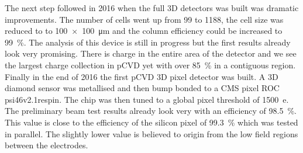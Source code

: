 The next step followed in 2016 when the full 3D detectors was built was dramatic improvements. The number of cells went up from 99 to 1188, the cell size was reduced to to \SI{100x100}{\micro\meter} and the column efficiency could be increased to \SI{99}{\%}. The analysis of this device is still in progress but the first results already look very promising. There is charge in the entire area of the detector and we see the largest charge collection in \ac{pCVD} yet with over \SI{85}{\%} in a contiguous region.\\
Finally in the end of 2016 the first \ac{pCVD} 3D pixel detector was built. A 3D diamond sensor was metallised and then bump bonded to a CMS pixel \ac{ROC} psi46v2.1respin. The chip was then tuned to a global pixel threshold of \SI{1500}{e}. The preliminary beam test results already look very with an efficiency of \SI{98.5}{\%}. This value is close to the efficiency of the silicon pixel of \SI{99.3}{\%} which was tested in parallel. The slightly lower value is believed to origin from the low field regions between the electrodes.